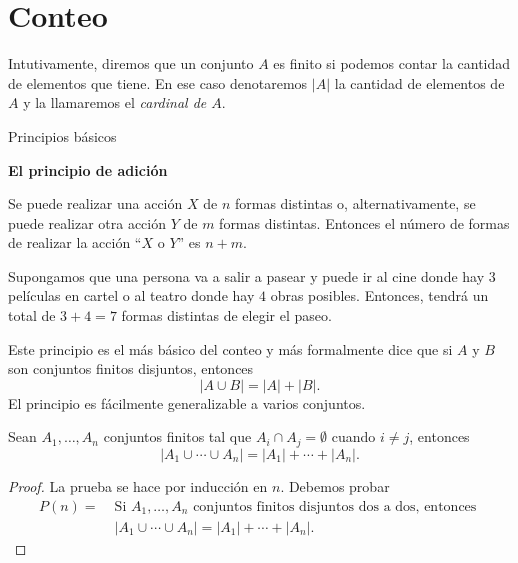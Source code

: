 



\chapter[Conteo]{Conteo}

Intutivamente, diremos que un conjunto $A$ es finito si podemos contar la cantidad de elementos que tiene. En ese caso denotaremos $|A|$ la cantidad de elementos de $A$ y la llamaremos el {\em cardinal de $A$}.  

\begin{section}{Principios básicos}


\noindent\textbf{El principio de adición}

Se puede realizar una acción $X$ de $n$ formas distintas o, alternativamente, se puede realizar otra acción $Y$ de $m$ formas distintas. Entonces el número de formas de realizar la acción ``$X$ o $Y$'' es $n + m$.

\begin{ejemplo}\label{cine} Supongamos que una persona va a salir a pasear  y puede ir al cine donde hay $3$ películas en cartel o al teatro donde hay $4$ obras posibles. Entonces, tendrá un total de $3+4=7$ formas distintas de elegir el paseo. 
\end{ejemplo}


Este principio es el más básico del conteo y más formalmente dice que si $A$ y $B$ son conjuntos finitos disjuntos, entonces 
\begin{equation}\label{padd}
|A \cup B| =|A|+|B|.
\end{equation}
El principio es fácilmente generalizable a varios conjuntos.

\begin{proposicion}\label{principiodeadicion}
Sean $A_1,\ldots,A_n$ conjuntos finitos tal que $A_i \cap A_j = \emptyset$ cuando $i\not=j$, entonces 
\begin{equation*}
|A_1 \cup \cdots \cup A_n| =|A_1|+\cdots+|A_n|.
\end{equation*}
\end{proposicion}



\begin{proof} 
La  prueba se hace por inducción en $n$. Debemos probar 
\begin{align*}
P(n) =\; &\text{Si $A_1,\ldots,A_n$ conjuntos finitos disjuntos dos a dos, entonces }\\  &|A_1 \cup \cdots \cup A_n| =|A_1|+\cdots+|A_n|.
\end{align*}


\end{proof}
\end{section}
